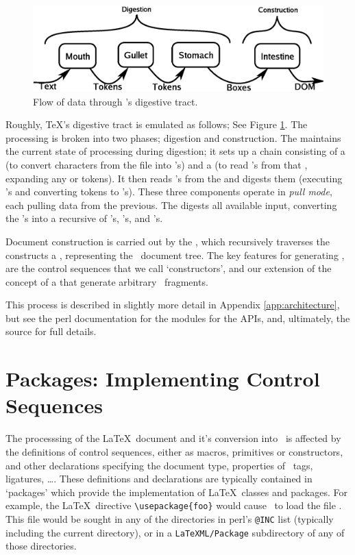 \documentclass{article}
\begin{document}
\begin{figure}[tb]
\includegraphics[width=\columnwidth]{dataflow}
\caption{Flow of data through \LaTeXML's digestive tract.\label{fig:dataflow}}
\end{figure}
Roughly, \TeX's digestive tract is emulated as follows; See Figure \ref{fig:dataflow}.
The processing is broken into two phases; digestion and construction.
The   maintains the current state of processing during digestion;
it sets up a chain consisting of a  (to convert characters from the file into 's) 
and a  (to read 's from that , expanding any  or
 tokens).
It then reads 's from the  and digests them
(executing 's and converting  tokens to 's).
These three components operate in \emph{pull mode}, each pulling data from the previous.
The  digests all available input, converting the 's into
a recursive  of 's, 's, and 's.

Document construction is carried out by the , which recursively traverses 
the  constructs a , representing the \XML\ document tree.
The key features for generating \XML, are the control sequences that we
call `constructors', and our extension of the concept of a  that generate arbitrary
\XML\ fragments.

This process is described in slightly more detail in Appendix \ref{app:architecture}, but
see the perl documentation  for the modules for the APIs, and, ultimately,
the source for full details.


\section{Packages: Implementing Control Sequences}\label{sec:packages}
The processsing of the \LaTeX\ document and it's  conversion into \XML\ is affected
by the definitions of control sequences, either as macros, primitives or constructors, 
and other declarations specifying the document type, properties of \XML\ tags, ligatures, \ldots.
These definitions and declarations are typically contained in `packages' which provide
the implementation of \LaTeX\ classes and packages.  For example, the \LaTeX\ directive
\verb|\usepackage{foo}| would cause \LaTeXML\ to load the file .
This file would be sought in any of the directories in perl's \verb|@INC| list (typically
including the current directory), or in a \verb|LaTeXML/Package| subdirectory of any of 
those directories.
\end{document}
